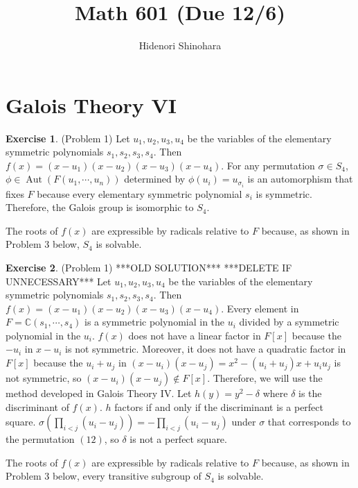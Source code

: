 \documentclass[12pt, psamsfonts]{amsart}
\theoremstyle{definition}
\newtheorem*{exer}{Exercise}
\theoremstyle{remark}
\DeclareMathOperator{\Aut}{Aut}
\numberwithin{equation}{section}
\begin{document}
\title{Math 601 (Due 12/6)}
\author{Hidenori Shinohara}
\maketitle

\tableofcontents

\section{Galois Theory VI}

\begin{exer}{(Problem 1)}
  Let $u_1, u_2, u_3, u_4$ be the variables of the elementary symmetric polynomials $s_1, s_2, s_3, s_4$.
  Then $f(x) = (x - u_1)(x - u_2)(x - u_3)(x - u_4)$.
  For any permutation $\sigma \in S_4$, $\phi \in \Aut(F(u_1, \cdots, u_n))$ determined by $\phi(u_i) = u_{\sigma_i}$ is an automorphism that fixes $F$ because every elementary symmetric polynomial $s_i$ is symmetric.
  Therefore, the Galois group is isomorphic to $S_4$.

  The roots of $f(x)$ are expressible by radicals relative to $F$ because, as shown in Problem 3 below, $S_4$ is solvable.
\end{exer}


\begin{exer}{(Problem 1)}
  ***OLD SOLUTION***
  ***DELETE IF UNNECESSARY***
  Let $u_1, u_2, u_3, u_4$ be the variables of the elementary symmetric polynomials $s_1, s_2, s_3, s_4$.
  Then $f(x) = (x - u_1)(x - u_2)(x - u_3)(x - u_4)$.
  Every element in $F = \mathbb{C}(s_1, \cdots, s_4)$ is a symmetric polynomial in the $u_i$ divided by a symmetric polynomial in the $u_i$.
  $f(x)$ does not have a linear factor in $F[x]$ because the $-u_i$ in $x - u_i$ is not symmetric.
  Moreover, it does not have a quadratic factor in $F[x]$ because the $u_i + u_j$ in $(x - u_i)(x - u_j) = x^2 - (u_i + u_j)x + u_iu_j$ is not symmetric, so $(x - u_i)(x - u_j) \notin F[x]$.
  Therefore, we will use the method developed in Galois Theory IV.
  Let $h(y) = y^2 - \delta$ where $\delta$ is the discriminant of $f(x)$.
  $h$ factors if and only if the discriminant is a perfect square.
  $\sigma(\prod_{i < j} (u_i - u_j)) = -\prod_{i < j} (u_i - u_j)$ under $\sigma$ that corresponds to the permutation $(12)$, so $\delta$ is not a perfect square.


  The roots of $f(x)$ are expressible by radicals relative to $F$ because, as shown in Problem 3 below, every transitive subgroup of $S_4$ is solvable.
\end{exer}
\end{document}

